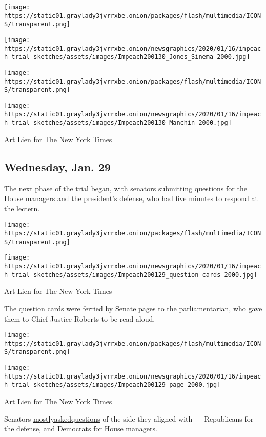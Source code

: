 \texttt{[image: https://static01.graylady3jvrrxbe.onion/packages/flash/multimedia/ICONS/transparent.png]}

\texttt{[image: https://static01.graylady3jvrrxbe.onion/newsgraphics/2020/01/16/impeach-trial-sketches/assets/images/Impeach200130\_Jones\_Sinema-2000.jpg]}

\texttt{[image: https://static01.graylady3jvrrxbe.onion/packages/flash/multimedia/ICONS/transparent.png]}

\texttt{[image: https://static01.graylady3jvrrxbe.onion/newsgraphics/2020/01/16/impeach-trial-sketches/assets/images/Impeach200130\_Manchin-2000.jpg]}

Art Lien for The New York Times

\hypertarget{wednesday-jan-29}{%
\subsection{Wednesday, Jan. 29}\label{wednesday-jan-29}}

The
\href{https://www.nytimes3xbfgragh.onion/live/2020/impeachment-trial-live-01-29}{next
phase of the trial began}, with senators submitting questions for the
House managers and the president's defense, who had five minutes to
respond at the lectern.

\texttt{[image: https://static01.graylady3jvrrxbe.onion/packages/flash/multimedia/ICONS/transparent.png]}

\texttt{[image: https://static01.graylady3jvrrxbe.onion/newsgraphics/2020/01/16/impeach-trial-sketches/assets/images/Impeach200129\_question-cards-2000.jpg]}

Art Lien for The New York Times

The question cards were ferried by Senate pages to the parliamentarian,
who gave them to Chief Justice Roberts to be read aloud.

\texttt{[image: https://static01.graylady3jvrrxbe.onion/packages/flash/multimedia/ICONS/transparent.png]}

\texttt{[image: https://static01.graylady3jvrrxbe.onion/newsgraphics/2020/01/16/impeach-trial-sketches/assets/images/Impeach200129\_page-2000.jpg]}

Art Lien for The New York Times

Senators
\href{https://www.nytimes3xbfgragh.onion/live/2020/impeachment-trial-live-01-29?action=click\&module=Top\%20Stories\&pgtype=Homepage\#senators-home-team}{mostly}\href{https://www.nytimes3xbfgragh.onion/live/2020/impeachment-trial-live-01-29?action=click\&module=Top\%20Stories\&pgtype=Homepage\#senators-home-team}{asked}\href{https://www.nytimes3xbfgragh.onion/live/2020/impeachment-trial-live-01-29?action=click\&module=Top\%20Stories\&pgtype=Homepage\#senators-home-team}{questions}
of the side they aligned with --- Republicans for the defense, and
Democrats for House managers.

